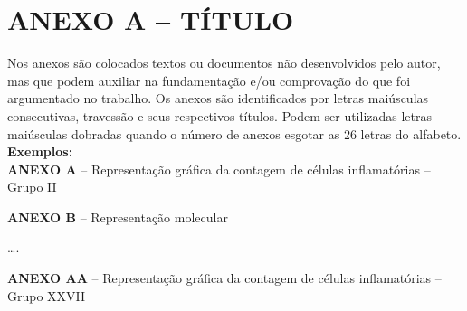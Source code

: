 \chapter*{\textbf{ANEXO A – TÍTULO}} %


Nos anexos são colocados textos ou documentos não desenvolvidos pelo autor, mas que podem auxiliar na fundamentação e/ou comprovação do que foi argumentado no trabalho. Os anexos são identificados por letras maiúsculas consecutivas, travessão e seus respectivos títulos. Podem ser utilizadas letras maiúsculas dobradas quando o número de anexos esgotar as 26 letras do alfabeto.\\

\noindent
\textbf{Exemplos:}\\

\textbf{ANEXO A} – Representação gráfica da contagem de células inflamatórias – Grupo II

\textbf{ANEXO B} – Representação molecular

….

\textbf{ANEXO AA} – Representação gráfica da contagem de células inflamatórias – Grupo XXVII

